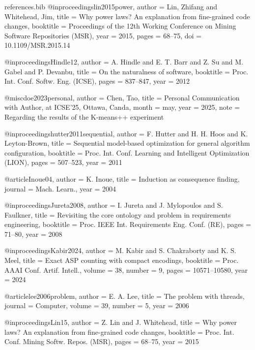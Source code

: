 \documentclass[pdflatex,sn-basic]{sn-jnl}
\begin{document}
\begin{filecontents}{references.bib}
@inproceedings{lin2015power,
  author = {Lin, Zhifang and Whitehead, Jim},
  title = {Why power laws? {A}n explanation from fine-grained code changes},
  booktitle = {Proceedings of the 12th Working Conference on Mining Software Repositories (MSR)},
  year = {2015},
  pages = {68--75},
  doi = {10.1109/MSR.2015.14}
}



@inproceedings{Hindle12,
  author    = {A. Hindle and E. T. Barr and Z. Su and M. Gabel and P. Devanbu},
  title     = {On the naturalness of software},
  booktitle = {Proc. Int. Conf. Softw. Eng. (ICSE)},
  pages     = {837--847},
  year      = {2012}
}

@misc{doe2023personal,
  author = {Chen, Tao},
  title = {Personal Communication with Author, at ICSE'25, Ottawa, Canda},
  month = may,
  year = {2025},
  note = {Regarding the results of the K-means++ experiment} 
}


@inproceedings{hutter2011sequential,
  author    = {F. Hutter and H. H. Hoos and K. Leyton-Brown},
  title     = {Sequential model-based optimization for general algorithm configuration},
  booktitle = {Proc. Int. Conf. Learning and Intelligent Optimization (LION)},
  pages     = {507--523},
  year      = {2011}
}

@article{Inoue04,
  author  = {K. Inoue},
  title   = {Induction as consequence finding},
  journal = {Mach. Learn.},
  year    = {2004}
}



@inproceedings{Jureta2008,
  author    = {I. Jureta and J. Mylopoulos and S. Faulkner},
  title     = {Revisiting the core ontology and problem in requirements engineering},
  booktitle = {Proc. IEEE Int. Requirements Eng. Conf. (RE)},
  pages     = {71--80},
  year      = {2008}
}


@inproceedings{Kabir2024,
  author    = {M. Kabir and S. Chakraborty and K. S. Meel},
  title     = {Exact ASP counting with compact encodings},
  booktitle = {Proc. AAAI Conf. Artif. Intell.},
  volume    = {38},
  number    = {9},
  pages     = {10571--10580},
  year      = {2024}
}



@article{lee2006problem,
 author  = {E. A. Lee},
  title   = {The problem with threads},
  journal = {Computer},
  volume  = {39},
  number  = {5},
  year = {2006}
}

@inproceedings{Lin15,
  author    = {Z. Lin and J. Whitehead},
  title     = {Why power laws? An explanation from fine-grained code changes},
  booktitle = {Proc. Int. Conf. Mining Softw. Repos. (MSR)},
  pages     = {68--75},
  year      = {2015}
}




\end{filecontents}
\end{document}
